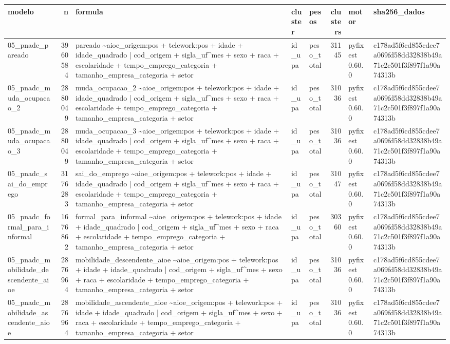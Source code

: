 \begin{tabular}{lrlllrll}
\toprule
modelo & n & formula & cluster & pesos & clusters & motor & sha256\_dados \\
\midrule
05\_pnadc\_pareado & 3960584 & pareado \textasciitilde \space aioe\_origem:pos + telework:pos + idade + idade\_quadrado | cod\_origem + sigla\_uf\textasciicircum mes + sexo + raca + escolaridade + tempo\_emprego\_categoria + tamanho\_empresa\_categoria + setor & id\_upa & peso\_total & 31145 & pyfixest 0.60.0 & c178ad5f6cd855cdee7a069fd58dd32838b49a71c2c501f3f897f1a90a74313b \\
05\_pnadc\_muda\_ocupacao\_2 & 2880049 & muda\_ocupacao\_2 \textasciitilde \space aioe\_origem:pos + telework:pos + idade + idade\_quadrado | cod\_origem + sigla\_uf\textasciicircum mes + sexo + raca + escolaridade + tempo\_emprego\_categoria + tamanho\_empresa\_categoria + setor & id\_upa & peso\_total & 31036 & pyfixest 0.60.0 & c178ad5f6cd855cdee7a069fd58dd32838b49a71c2c501f3f897f1a90a74313b \\
05\_pnadc\_muda\_ocupacao\_3 & 2880049 & muda\_ocupacao\_3 \textasciitilde \space aioe\_origem:pos + telework:pos + idade + idade\_quadrado | cod\_origem + sigla\_uf\textasciicircum mes + sexo + raca + escolaridade + tempo\_emprego\_categoria + tamanho\_empresa\_categoria + setor & id\_upa & peso\_total & 31036 & pyfixest 0.60.0 & c178ad5f6cd855cdee7a069fd58dd32838b49a71c2c501f3f897f1a90a74313b \\
05\_pnadc\_sai\_do\_emprego & 3176283 & sai\_do\_emprego \textasciitilde \space aioe\_origem:pos + telework:pos + idade + idade\_quadrado | cod\_origem + sigla\_uf\textasciicircum mes + sexo + raca + escolaridade + tempo\_emprego\_categoria + tamanho\_empresa\_categoria + setor & id\_upa & peso\_total & 31047 & pyfixest 0.60.0 & c178ad5f6cd855cdee7a069fd58dd32838b49a71c2c501f3f897f1a90a74313b \\
05\_pnadc\_formal\_para\_informal & 1676862 & formal\_para\_informal \textasciitilde \space aioe\_origem:pos + telework:pos + idade + idade\_quadrado | cod\_origem + sigla\_uf\textasciicircum mes + sexo + raca + escolaridade + tempo\_emprego\_categoria + tamanho\_empresa\_categoria + setor & id\_upa & peso\_total & 30360 & pyfixest 0.60.0 & c178ad5f6cd855cdee7a069fd58dd32838b49a71c2c501f3f897f1a90a74313b \\
05\_pnadc\_mobilidade\_descendente\_aioe & 2876964 & mobilidade\_descendente\_aioe \textasciitilde \space aioe\_origem:pos + telework:pos + idade + idade\_quadrado | cod\_origem + sigla\_uf\textasciicircum mes + sexo + raca + escolaridade + tempo\_emprego\_categoria + tamanho\_empresa\_categoria + setor & id\_upa & peso\_total & 31036 & pyfixest 0.60.0 & c178ad5f6cd855cdee7a069fd58dd32838b49a71c2c501f3f897f1a90a74313b \\
05\_pnadc\_mobilidade\_ascendente\_aioe & 2876964 & mobilidade\_ascendente\_aioe \textasciitilde \space aioe\_origem:pos + telework:pos + idade + idade\_quadrado | cod\_origem + sigla\_uf\textasciicircum mes + sexo + raca + escolaridade + tempo\_emprego\_categoria + tamanho\_empresa\_categoria + setor & id\_upa & peso\_total & 31036 & pyfixest 0.60.0 & c178ad5f6cd855cdee7a069fd58dd32838b49a71c2c501f3f897f1a90a74313b \\
\bottomrule
\end{tabular}
